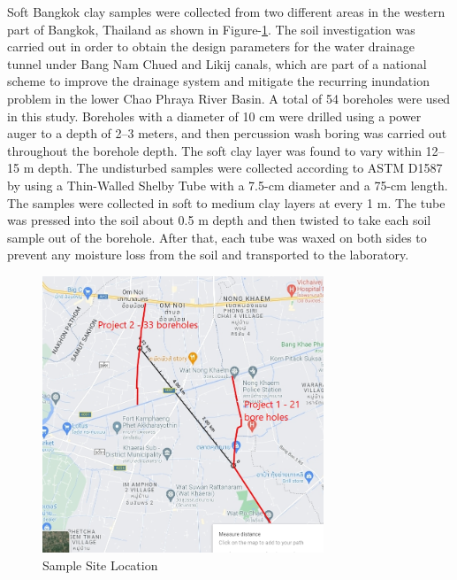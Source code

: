 \documentclass[12pt,a4paper]{article}
\begin{document}
	Soft Bangkok clay samples were collected from two different areas in the western part of Bangkok, Thailand as shown in Figure-\ref{Sample Site Location}. The soil investigation was carried out in order to obtain the design parameters for the water drainage tunnel under Bang Nam Chued and Likij canals, which are part of a national scheme to improve the drainage system and mitigate the recurring inundation problem in the lower Chao Phraya River Basin. A total of 54 boreholes were used in this study. Boreholes with a diameter of 10 cm were drilled using a power auger to a depth of 2–3 meters, and then percussion wash boring was carried out throughout the borehole depth. The soft clay layer was found to vary within 12–15 m depth. The undisturbed samples were collected according to ASTM D1587 by using a Thin-Walled Shelby Tube with a 7.5-cm diameter and a 75-cm length. The samples were collected in soft to medium clay layers at every 1 m. The tube was pressed into the soil about 0.5 m depth and then twisted to take each soil sample out of the borehole. After that, each tube was waxed on both sides to prevent any moisture loss from the soil and transported to the laboratory.
	
	\begin{figure}[H]
		\centering
		\includegraphics[width=0.75\textwidth]{site location.jpg}
		\caption{Sample Site Location}
		\label{Sample Site Location}
	\end{figure}
	
\end{document}

